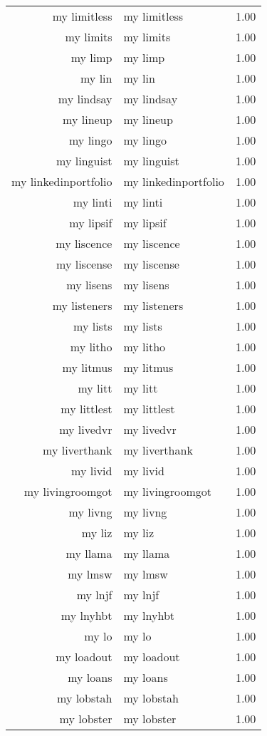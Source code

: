 \begin{table}[ht]
\begin{tabular}{rlr}
  my limitless & my limitless & 1.00 \\ 
  my limits & my limits & 1.00 \\ 
  my limp & my limp & 1.00 \\ 
  my lin & my lin & 1.00 \\ 
  my lindsay & my lindsay & 1.00 \\ 
  my lineup & my lineup & 1.00 \\ 
  my lingo & my lingo & 1.00 \\ 
  my linguist & my linguist & 1.00 \\ 
  my linkedinportfolio & my linkedinportfolio & 1.00 \\ 
  my linti & my linti & 1.00 \\ 
  my lipsif & my lipsif & 1.00 \\ 
  my liscence & my liscence & 1.00 \\ 
  my liscense & my liscense & 1.00 \\ 
  my lisens & my lisens & 1.00 \\ 
  my listeners & my listeners & 1.00 \\ 
  my lists & my lists & 1.00 \\ 
  my litho & my litho & 1.00 \\ 
  my litmus & my litmus & 1.00 \\ 
  my litt & my litt & 1.00 \\ 
  my littlest & my littlest & 1.00 \\ 
  my livedvr & my livedvr & 1.00 \\ 
  my liverthank & my liverthank & 1.00 \\ 
  my livid & my livid & 1.00 \\ 
  my livingroomgot & my livingroomgot & 1.00 \\ 
  my livng & my livng & 1.00 \\ 
  my liz & my liz & 1.00 \\ 
  my llama & my llama & 1.00 \\ 
  my lmsw & my lmsw & 1.00 \\ 
  my lnjf & my lnjf & 1.00 \\ 
  my lnyhbt & my lnyhbt & 1.00 \\ 
  my lo & my lo & 1.00 \\ 
  my loadout & my loadout & 1.00 \\ 
  my loans & my loans & 1.00 \\ 
  my lobstah & my lobstah & 1.00 \\ 
  my lobster & my lobster & 1.00 \\ 

\end{tabular}
\end{table}
